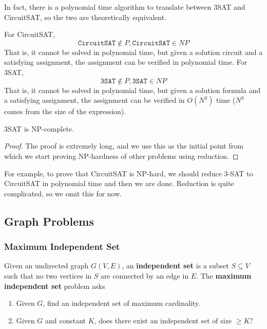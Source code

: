   In fact, there is a polynomial time algorithm to translate between 3SAT and CircuitSAT, so the two are theoretically equivalent. 

  \begin{theorem}
    For CircuitSAT, 
    \begin{equation}
      \texttt{CircuitSAT} \not\in P, \texttt{CircuitSAT} \in NP
    \end{equation}
    That is, it cannot be solved in polynomial time, but given a solution circuit and a satisfying assignment, the assignment can be verified in polynomial time. 
    For 3SAT, 
    \begin{equation}
      \texttt{3SAT} \not\in P, \texttt{3SAT} \in NP
    \end{equation}
    That is, it cannot be solved in polynomial time, but given a solution formula and a satisfying assignment, the assignment can be verified in $O(N^3)$ time ($N^3$ comes from the size of the expression). 
  \end{theorem}

  \begin{theorem}
    3SAT is NP-complete. 
  \end{theorem} 
  \begin{proof}
    The proof is extremely long, and we use this as the initial point from which we start proving NP-hardness of other problems using reduction. 
  \end{proof}

  For example, to prove that CircuitSAT is NP-hard, we should reduce 3-SAT to CircuitSAT in polynomial time and then we are done. Reduction is quite complicated, so we omit this for now. 

\subsection{Graph Problems}

  \subsubsection{Maximum Independent Set}

    \begin{definition}[MIS]
      Given an undirected graph $G(V, E)$, an \textbf{independent set} is a subset $S \subseteq V$ such that no two vertices in $S$ are connected by an edge in $E$. The \textbf{maximum independent set} problem asks 
      \begin{enumerate}
        \item Given $G$, find an independent set of maximum cardinality. 
        \item Given $G$ and constant $K$, does there exist an independent set of size $\geq K$? 
      \end{enumerate}
    \end{definition}

